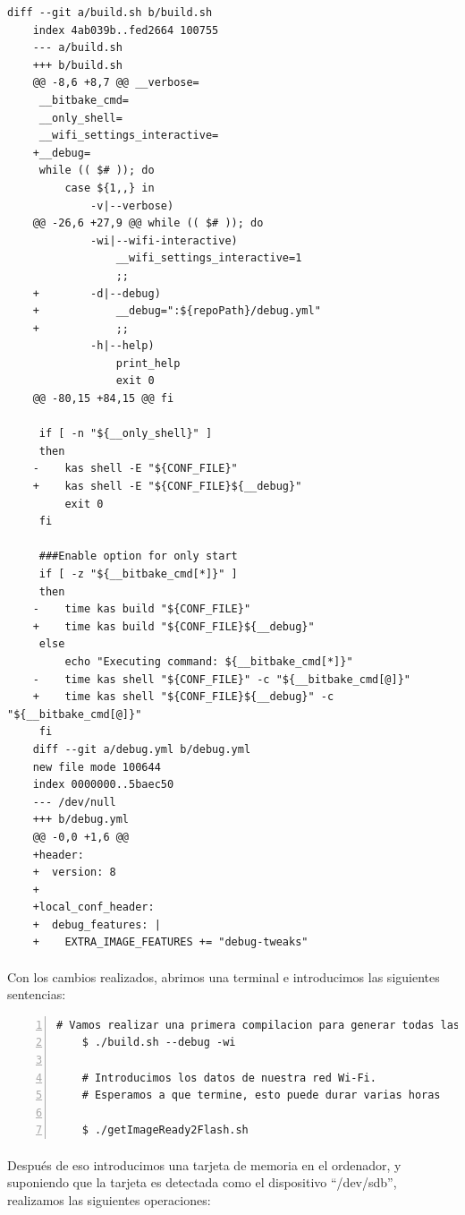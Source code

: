 \begin{lstlisting}[style=consola]
    diff --git a/build.sh b/build.sh
    index 4ab039b..fed2664 100755
    --- a/build.sh
    +++ b/build.sh
    @@ -8,6 +8,7 @@ __verbose=
     __bitbake_cmd=
     __only_shell=
     __wifi_settings_interactive=
    +__debug=
     while (( $# )); do
         case ${1,,} in
             -v|--verbose)
    @@ -26,6 +27,9 @@ while (( $# )); do
             -wi|--wifi-interactive)
                 __wifi_settings_interactive=1
                 ;;
    +        -d|--debug)
    +            __debug=":${repoPath}/debug.yml"
    +            ;;
             -h|--help)
                 print_help
                 exit 0
    @@ -80,15 +84,15 @@ fi

     if [ -n "${__only_shell}" ]
     then
    -    kas shell -E "${CONF_FILE}"
    +    kas shell -E "${CONF_FILE}${__debug}"
         exit 0
     fi

     ###Enable option for only start
     if [ -z "${__bitbake_cmd[*]}" ]
     then
    -    time kas build "${CONF_FILE}"
    +    time kas build "${CONF_FILE}${__debug}"
     else
         echo "Executing command: ${__bitbake_cmd[*]}"
    -    time kas shell "${CONF_FILE}" -c "${__bitbake_cmd[@]}"
    +    time kas shell "${CONF_FILE}${__debug}" -c "${__bitbake_cmd[@]}"
     fi
    diff --git a/debug.yml b/debug.yml
    new file mode 100644
    index 0000000..5baec50
    --- /dev/null
    +++ b/debug.yml
    @@ -0,0 +1,6 @@
    +header:
    +  version: 8
    +
    +local_conf_header:
    +  debug_features: |
    +    EXTRA_IMAGE_FEATURES += "debug-tweaks"
\end{lstlisting}

\paragraph{}Con los cambios realizados, abrimos una terminal e introducimos las siguientes
sentencias:

\begin{lstlisting}[style=consola, numbers=left]
    # Vamos realizar una primera compilacion para generar todas las tools del SDK
    $ ./build.sh --debug -wi

    # Introducimos los datos de nuestra red Wi-Fi.
    # Esperamos a que termine, esto puede durar varias horas

    $ ./getImageReady2Flash.sh
\end{lstlisting}

\paragraph{}Después de eso introducimos una tarjeta de memoria en el ordenador, y
suponiendo que la tarjeta es detectada como el dispositivo ``/dev/sdb'', realizamos
las siguientes operaciones:

